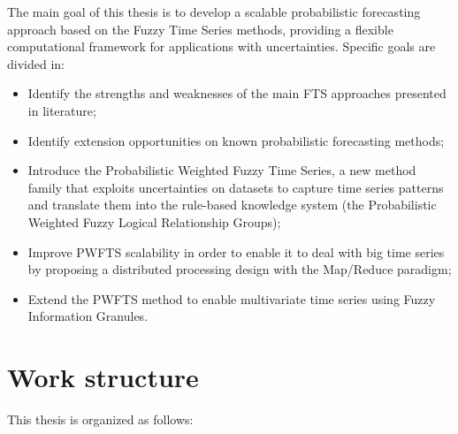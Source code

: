 
The main goal of this thesis is to develop a scalable probabilistic forecasting approach based on the Fuzzy Time Series methods, providing a flexible computational framework for applications with uncertainties. Specific goals are divided in:

\begin{itemize}
\item Identify the strengths and weaknesses of the main FTS approaches presented in literature;
\item Identify extension opportunities on known probabilistic forecasting methods;
\item Introduce the Probabilistic Weighted Fuzzy Time Series, a new method family that exploits uncertainties on datasets to capture time series patterns and translate them into the rule-based knowledge system (the Probabilistic Weighted Fuzzy Logical Relationship Groups);
\item Improve PWFTS scalability in order to enable it to deal with big time series by proposing a distributed processing design with the Map/Reduce paradigm; 
\item Extend the PWFTS method to enable multivariate time series using Fuzzy Information Granules.
\end{itemize}

\section{Work structure} 

This thesis is organized as follows:

